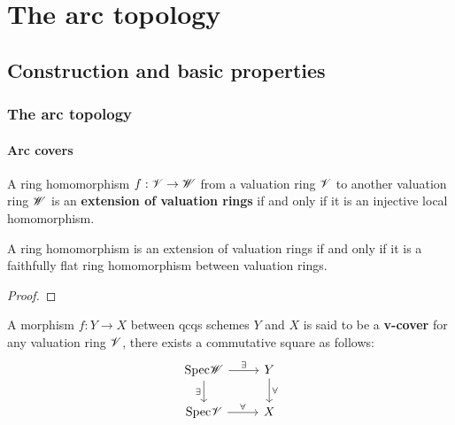 \chapter{The arc topology}
    \begin{abstract}
        
    \end{abstract}
    
    \minitoc
    
    \section{Construction and basic properties}
        \subsection{The arc topology}
            \subsubsection{Arc covers}
                \begin{definition} \label{def: valuation_ring_extensions}
                    A ring homomorphism $f: \mathscr{V} \to \mathscr{W}$ from a valuation ring $\mathscr{V}$ to another valuation ring $\mathscr{W}$ is an \textbf{extension of valuation rings} if and only if it is an injective local homomorphism.
                \end{definition}
                \begin{proposition} \label{prop: valution_ring_extensions_are_faithfully_flat}
                    A ring homomorphism is an extension of valuation rings if and only if it is a faithfully flat ring homomorphism between valuation rings.
                \end{proposition}
                    \begin{proof}
                            
                    \end{proof}
                \begin{definition}[v-covers] \label{def: v_covers_for_schemes}
                    A morphism $f: Y \to X$ between qcqs schemes $Y$ and $X$ is said to be a \textbf{v-cover} for any valuation ring $\mathscr{V}$, there exists a commutative square as follows:
                        $$
                            \begin{tikzcd}
                            	{\Spec \scrW} & Y \\
                            	{\Spec \scrV} & X
                            	\arrow["\forall", from=1-2, to=2-2]
                            	\arrow["\forall", from=2-1, to=2-2]
                            	\arrow["\exists"', from=1-1, to=2-1]
                            	\arrow["\exists", from=1-1, to=1-2]
                            \end{tikzcd}
                        $$
                \end{definition}
